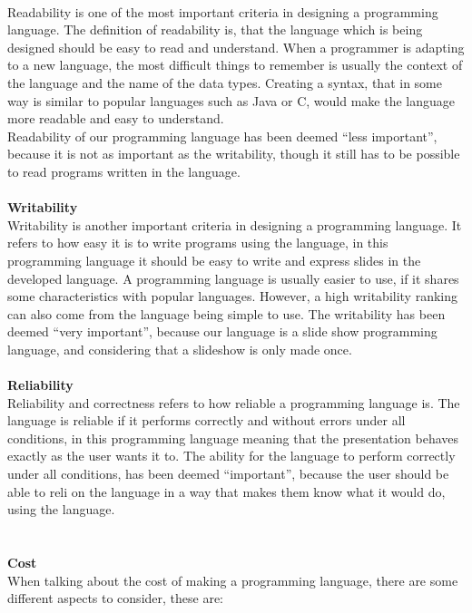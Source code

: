  \\
Readability is one of the most important criteria in designing a programming language. The definition of readability is, that the language which is being designed should be easy to read and understand. When a programmer is adapting to a new language, the most difficult things to remember is usually the context of the language and the name of the data types. Creating a syntax, that in some way is similar to popular languages such as Java or C, would make the language more readable and easy to understand. \\
Readability of our programming language has been deemed ``less important'', because it is not as important as the writability, though it still has to be possible to read programs written in the language.
\\ \\
\textbf{Writability} \\
Writability is another important criteria in designing a programming language. It refers to how easy it is to write programs using the language, in this programming language it should be easy to write and express slides in the developed language. A programming language is usually easier to use, if it shares some characteristics with popular languages. However, a high writability ranking can also come from the language being simple to use. The writability has been deemed ``very important'', because our language is a slide show programming language, and considering that a slideshow is only made once.
\\ \\
\textbf{Reliability} \\
Reliability and correctness refers to how reliable a programming language is. The language is reliable if it performs correctly and without errors under all conditions, in this programming language meaning that the presentation behaves exactly as the user wants it to. The ability for the language to perform correctly under all conditions, has been deemed ``important'', because the user should be able to reli on the language in a way that makes them know what it would do, using the language.\\
\\ \\
\textbf{Cost} \\
When talking about the cost of making a programming language, there are some different aspects to consider, these are:
